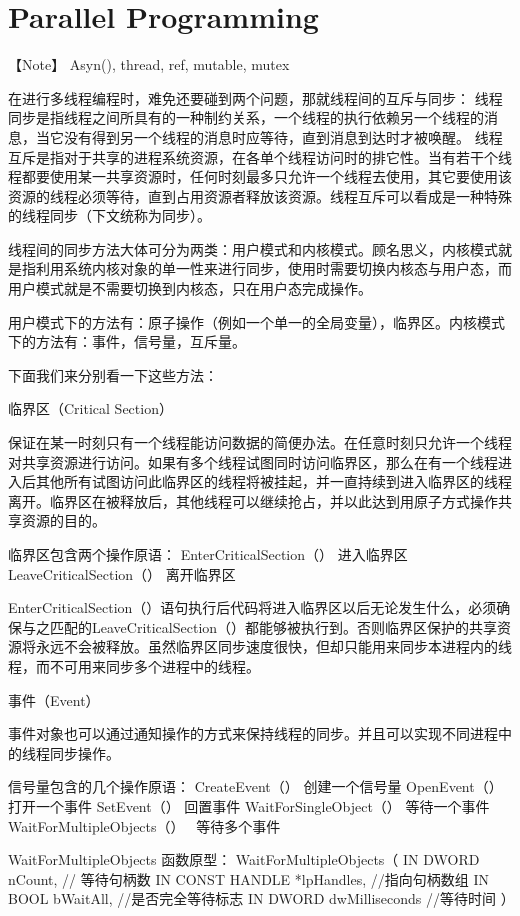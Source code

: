\chapter{Parallel Programming}

【Note】 Asyn(), thread, ref, mutable, mutex

在进行多线程编程时，难免还要碰到两个问题，那就线程间的互斥与同步：
线程同步是指线程之间所具有的一种制约关系，一个线程的执行依赖另一个线程的消息，当它没有得到另一个线程的消息时应等待，直到消息到达时才被唤醒。
线程互斥是指对于共享的进程系统资源，在各单个线程访问时的排它性。当有若干个线程都要使用某一共享资源时，任何时刻最多只允许一个线程去使用，其它要使用该资源的线程必须等待，直到占用资源者释放该资源。线程互斥可以看成是一种特殊的线程同步（下文统称为同步）。

线程间的同步方法大体可分为两类：用户模式和内核模式。顾名思义，内核模式就是指利用系统内核对象的单一性来进行同步，使用时需要切换内核态与用户态，而用户模式就是不需要切换到内核态，只在用户态完成操作。

用户模式下的方法有：原子操作（例如一个单一的全局变量），临界区。内核模式下的方法有：事件，信号量，互斥量。

下面我们来分别看一下这些方法：

临界区（Critical Section）

保证在某一时刻只有一个线程能访问数据的简便办法。在任意时刻只允许一个线程对共享资源进行访问。如果有多个线程试图同时访问临界区，那么在有一个线程进入后其他所有试图访问此临界区的线程将被挂起，并一直持续到进入临界区的线程离开。临界区在被释放后，其他线程可以继续抢占，并以此达到用原子方式操作共享资源的目的。

临界区包含两个操作原语：
EnterCriticalSection（） 进入临界区 
LeaveCriticalSection（） 离开临界区

EnterCriticalSection（）语句执行后代码将进入临界区以后无论发生什么，必须确保与之匹配的LeaveCriticalSection（）都能够被执行到。否则临界区保护的共享资源将永远不会被释放。虽然临界区同步速度很快，但却只能用来同步本进程内的线程，而不可用来同步多个进程中的线程。


事件（Event） 

事件对象也可以通过通知操作的方式来保持线程的同步。并且可以实现不同进程中的线程同步操作。

信号量包含的几个操作原语： 
CreateEvent（）    创建一个信号量 
OpenEvent（）    打开一个事件 
SetEvent（）    回置事件 
WaitForSingleObject（）   等待一个事件 
WaitForMultipleObjects（）　 等待多个事件

WaitForMultipleObjects 函数原型： 
WaitForMultipleObjects（ 
IN DWORD nCount, // 等待句柄数 
IN CONST HANDLE *lpHandles, //指向句柄数组 
IN BOOL bWaitAll, //是否完全等待标志 
IN DWORD dwMilliseconds //等待时间 
） 

